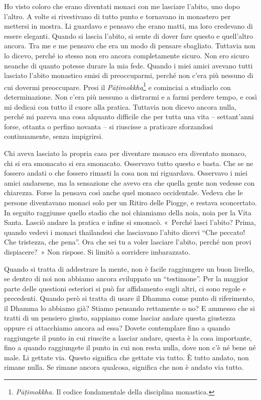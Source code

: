 Ho visto coloro che erano diventati monaci con me lasciare l'abito, uno
dopo l'altro. A volte si rivestivano di tutto punto e tornavano in
monastero per mettersi in mostra. Li guardavo e pensavo che erano matti,
ma loro credevano di essere eleganti. Quando si lascia l'abito, si sente
di dover fare questo e quell'altro ancora. Tra me e me pensavo che era
un modo di pensare sbagliato. Tuttavia non lo dicevo, perché io stesso
non ero ancora completamente sicuro. Non ero sicuro neanche di quanto
potesse durare la mia fede. Quando i miei amici avevano tutti lasciato
l'abito monastico smisi di preoccuparmi, perché non c'era più nessuno di
cui dovermi preoccupare. Presi il \emph{Pāṭimokkha}\footnote{\emph{Pāṭimokkha.}
  Il codice fondamentale della disciplina monastica.} e cominciai a
studiarlo con determinazione. Non c'era più nessuno a distrarmi e a
farmi perdere tempo, e così mi dedicai con tutto il cuore alla pratica.
Tuttavia non dicevo ancora nulla, perché mi pareva una cosa alquanto
difficile che per tutta una vita -- settant'anni forse, ottanta o
perfino novanta -- si riuscisse a praticare sforzandosi continuamente,
senza impigrirsi.

Chi aveva lasciato la propria casa per diventare monaco era diventato
monaco, chi si era smonacato si era smonacato. Osservavo tutto questo e
basta. Che se ne fossero andati o che fossero rimasti la cosa non mi
riguardava. Osservavo i miei amici andarsene, ma la sensazione che avevo
era che quella gente non vedesse con chiarezza. Forse la pensava così
anche quel monaco occidentale. Vedeva che le persone diventavano monaci
solo per un Ritiro delle Piogge, e restava sconcertato. In seguito
raggiunse quello stadio che noi chiamiamo della noia, noia per la Vita
Santa. Lasciò andare la pratica e infine si smonacò. «~Perché lasci
l'abito? Prima, quando vedevi i monaci thailandesi che lasciavano
l'abito dicevi ``Che peccato! Che tristezza, che pena''. Ora che sei tu
a voler lasciare l'abito, perché non provi dispiacere?~» Non rispose. Si
limitò a sorridere imbarazzato.

Quando si tratta di addestrare la mente, non è facile raggiungere un
buon livello, se dentro di noi non abbiamo ancora sviluppato un
``testimone''. Per la maggior parte delle questioni esteriori si può far
affidamento sugli altri, ci sono regole e precedenti. Quando però si
tratta di usare il Dhamma come punto di riferimento, il Dhamma lo
abbiamo già? Stiamo pensando rettamente o no? E ammesso che si tratti di
un pensiero giusto, sappiamo come lasciar andare questa giustezza oppure
ci attacchiamo ancora ad essa? Dovete contemplare fino a quando
raggiungete il punto in cui riuscite a lasciar andare, questa è la cosa
importante, fino a quando raggiungete il punto in cui non resta nulla,
dove non c'è né bene né male. Li gettate via. Questo significa che
gettate via tutto. È tutto andato, non rimane nulla. Se rimane ancora
qualcosa, significa che non è andato via tutto.

